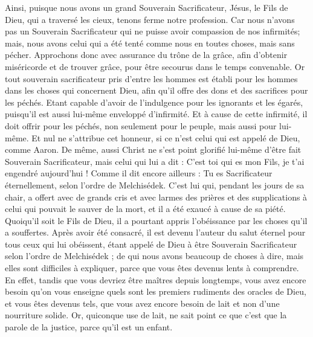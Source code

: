 \begin{multicols}{2}
Ainsi, puisque nous avons un grand Souverain Sacrificateur, Jésus, le Fils de Dieu, qui a traversé les cieux, tenons ferme notre profession.
Car nous n'avons pas un Souverain Sacrificateur qui ne puisse avoir compassion de nos infirmités; mais, nous avons celui qui a été tenté comme nous en toutes choses, mais sans pécher.
Approchons donc avec assurance du trône de la grâce, afin d'obtenir miséricorde et de trouver grâce, pour être secourus dans le temps convenable.
\VerseOne{}Or tout souverain sacrificateur pris d'entre les hommes est établi pour les hommes dans les choses qui concernent Dieu, afin qu'il offre des dons et des sacrifices pour les péchés.
Etant capable d'avoir de l'indulgence pour les ignorants et les égarés, puisqu'il est aussi lui-même enveloppé d'infirmité.
Et à cause de cette infirmité, il doit offrir pour les péchés, non seulement pour le peuple, mais aussi pour lui-même.
Et nul ne s'attribue cet honneur, si ce n'est celui qui est appelé de Dieu, comme Aaron.
De même, aussi Christ ne s'est point glorifié lui-même d'être fait Souverain Sacrificateur, mais celui qui lui a dit : C'est toi qui es mon Fils, je t'ai engendré aujourd'hui !
Comme il dit encore ailleurs : Tu es Sacrificateur éternellement, selon l'ordre de Melchisédek.
C'est lui qui, pendant les jours de sa chair, a offert avec de grands cris et avec larmes des prières et des supplications à celui qui pouvait le sauver de la mort, et il a été exaucé à cause de sa piété.
Quoiqu'il soit le Fils de Dieu, il a pourtant appris l'obéissance par les choses qu'il a souffertes.
Après avoir été consacré, il est devenu l'auteur du salut éternel pour tous ceux qui lui obéissent,
étant appelé de Dieu à être Souverain Sacrificateur selon l'ordre de Melchisédek ;
de qui nous avons beaucoup de choses à dire, mais elles sont difficiles à expliquer, parce que vous êtes devenus lents à comprendre.
En effet, tandis que vous devriez être maîtres depuis longtemps, vous avez encore besoin qu'on vous enseigne quels sont les premiers rudiments des oracles de Dieu, et vous êtes devenus tels, que vous avez encore besoin de lait et non d'une nourriture solide.
Or, quiconque use de lait, ne sait point ce que c'est que la parole de la justice, parce qu'il est un enfant.

\end{multicols}
